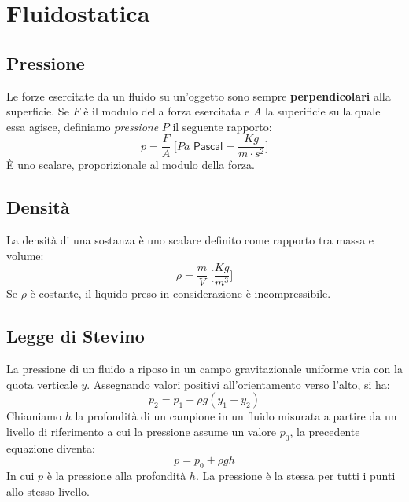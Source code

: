 \chapter{Fluidostatica}

    \section{Pressione} Le forze esercitate da un fluido su un'oggetto sono 
    sempre \textbf{perpendicolari} alla superficie. Se $F$ è il modulo della 
    forza esercitata e $A$ la superificie sulla quale essa agisce, definiamo
    \textit{pressione} $P$ il seguente rapporto:
        \begin{equation}
            p = \frac{F}{A} \; \Bigg[Pa \textsf{ Pascal} = \frac{Kg}{m \cdot 
            s^2} \Bigg]
        \end{equation}
    È uno scalare, proporizionale al modulo della forza.

    \section{Densità} La densità di una sostanza è uno scalare definito come 
    rapporto tra massa e volume:
        \begin{equation}
            \rho = \frac{m}{V} \; \Bigg[\frac{Kg}{m^3}\Bigg]
        \end{equation}
    Se $\rho$ è costante, il liquido preso in considerazione è incompressibile.

    \section{Legge di Stevino} La pressione di un fluido a riposo in un campo
    gravitazionale uniforme vria con la quota verticale $y$. Assegnando valori
    positivi all'orientamento verso l'alto, si ha:
        \begin{equation*}
            p_2 = p_1 + \rho g(y_1-y_2)
        \end{equation*}
    Chiamiamo $h$ la profondità di un campione in un fluido misurata a partire
    da un livello di riferimento a cui la pressione assume un valore $p_0$, la 
    precedente equazione diventa:
        \begin{equation}
            p = p_0 + \rho gh
        \end{equation}
    In cui $p$ è la pressione alla profondità $h$.
    La pressione è la stessa per tutti i punti allo stesso livello.


